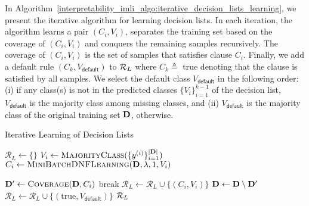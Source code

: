 In Algorithm~\ref{interpretability_imli_algo:iterative_decision_lists_learning}, we present the iterative algorithm for learning decision lists.  In each iteration, the algorithm learns a pair $ (C_i, V_i) $, separates the training set based on the coverage of $ (C_i, V_i) $ and conquers the remaining samples recursively. The coverage of $ (C_i, V_i) $ is the set of samples that satisfies clause $ C_i $. Finally, we add a default rule $ (C_k, V_\mathsf{default}) $ to $ {\mathcal{R}}_L $ where $ C_k \triangleq  $ true denoting that the clause is satisfied by all samples. We select the default class $ V_\mathsf{default} $ in the following order: (i) if any class(s) is not in the predicted classes $ \{V_i\}_{i=1}^{k-1} $ of the decision list, 
 $ V_{\mathsf{default}} $ is the majority class among missing classes, and (ii)  $ V_{\mathsf{default}} $ is the majority class of the original training set $ \mathbf{D} $, otherwise. 


\begin{algorithm}
	\caption{Iterative Learning of Decision Lists}
	\label{interpretability_imli_algo:iterative_decision_lists_learning}
	\begin{algorithmic}[1]
		\State $ \mathcal{R}_L \leftarrow \{\}$
		\State $ V_i \leftarrow \textsc{MajorityClass}(\{y^{(i)}\}_{i=1}^{|\mathbf{D}|}) $ 
		\State $ C_i \leftarrow \textsc{MiniBatchDNFLearning}( \mathbf{D}, \lambda, 1, V_i) $ 
		
		\State $ \mathbf{D}' \leftarrow \textsc{Coverage}(\mathbf{D}, C_i) $
		\State break
		\EndIf
		\State $ \mathcal{R}_L \leftarrow \mathcal{R}_L \cup \{(C_i, V_i)\} $
		\State $ \mathbf{D}  \leftarrow \mathbf{D}  \setminus \mathbf{D}' $ 
		\EndFor
		\State $ \mathcal{R}_L \leftarrow \mathcal{R}_L  \cup \{(\text{true}, V_{\mathsf{default}} )\}$	
		\State \Return $ {\mathcal{R}}_L $
		\EndProcedure
	\end{algorithmic}
	
\end{algorithm}


